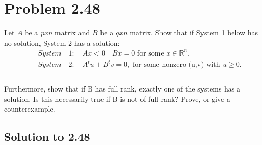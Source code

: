 \documentclass[12pt]{article}
\begin{document}
\section{Problem 2.48}
Let $A$ be a $p x n$ matrix and $B$ be a $q x n$ matrix. Show that if System 1 below has no solution, System 2 has a solution:\\
    \begin{align*}
        &\quad System \quad 1: \quad Ax < 0 \quad Bx =0 \text{ for some } x \in \mathbb{R}^n.\\
        &\quad System \quad 2: \quad A^tu + B^tv  = 0 ,\text{ for some  nonzero (u,v) with } u \geq 0.\\
    \end{align*} \\
Furthermore, show that if B has full rank, exactly one of the systems has a solution. Is this necessarily true if B is not of full rank? Prove, or give a counterexample.\\ 

\subsection{Solution to 2.48}
\end{document}
